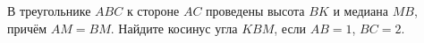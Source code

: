 \begin{ex}
	\begin{condition}
		В треугольнике \( ABC  \) к стороне \( AC  \) проведены высота \( BK  \) и медиана \( MB \), причём \( AM=BM \). Найдите косинус угла \( KBM \), если \( AB=1 \), \( BC=2 \).
	\end{condition}
\end{ex}